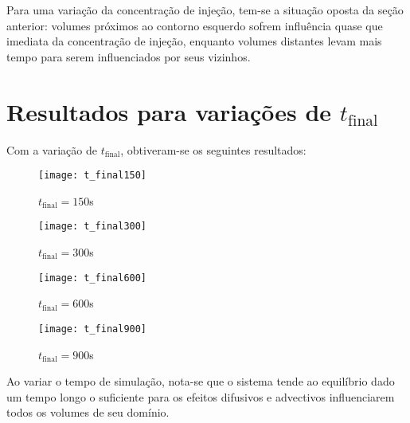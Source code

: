 Para uma variação da concentração de injeção, tem-se a situação oposta da seção
anterior: volumes próximos ao contorno esquerdo sofrem influência quase que
imediata da concentração de injeção, enquanto volumes distantes levam mais
tempo para serem influenciados por seus vizinhos.

\section{Resultados para variações de $t_\text{final}$}
Com a variação de $t_\text{final}$, obtiveram-se os seguintes resultados:
\begin{figure}[H]
    \centering
    \texttt{[image: t\_final150]}
    \caption{$t_\text{final} = 150$s}
\end{figure}
\begin{figure}[H]
    \centering
    \texttt{[image: t\_final300]}
    \caption{$t_\text{final} = 300$s}
\end{figure}
\begin{figure}[H]
    \centering
    \texttt{[image: t\_final600]}
    \caption{$t_\text{final} = 600$s}
\end{figure}
\begin{figure}[H]
    \centering
    \texttt{[image: t\_final900]}
    \caption{$t_\text{final} = 900$s}
\end{figure}

Ao variar o tempo de simulação, nota-se que o sistema tende ao equilíbrio dado
um tempo longo o suficiente para os efeitos difusivos e advectivos
influenciarem todos os volumes de seu domínio.



